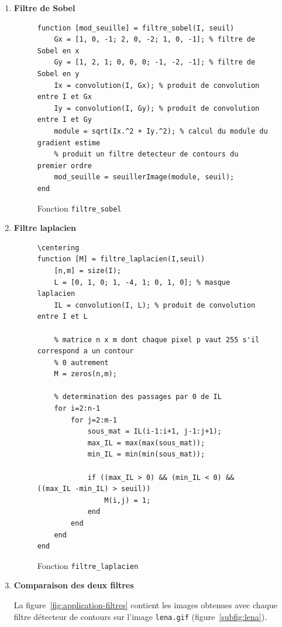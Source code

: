 \documentclass[a4paper]{article}
\newcommand{\figref}[1]{figure~\ref{#1}}
\begin{document}
\begin{enumerate}
    \item \textbf{Filtre de Sobel }

\begin{figure}[H]
\begin{lstlisting}
function [mod_seuille] = filtre_sobel(I, seuil)
    Gx = [1, 0, -1; 2, 0, -2; 1, 0, -1]; % filtre de Sobel en x
    Gy = [1, 2, 1; 0, 0, 0; -1, -2, -1]; % filtre de Sobel en y 
    Ix = convolution(I, Gx); % produit de convolution entre I et Gx 
    Iy = convolution(I, Gy); % produit de convolution entre I et Gy
    module = sqrt(Ix.^2 + Iy.^2); % calcul du module du gradient estime 
    % produit un filtre detecteur de contours du premier ordre
    mod_seuille = seuillerImage(module, seuil); 
end
\end{lstlisting}
\caption{Fonction \texttt{filtre\_sobel}}
\end{figure}

    \item \textbf{Filtre laplacien}

\begin{figure}[H]
\begin{lstlisting}
\centering
function [M] = filtre_laplacien(I,seuil)
    [n,m] = size(I);
    L = [0, 1, 0; 1, -4, 1; 0, 1, 0]; % masque laplacien 
    IL = convolution(I, L); % produit de convolution entre I et L
    
    % matrice n x m dont chaque pixel p vaut 255 s'il correspond a un contour
    % 0 autrement
    M = zeros(n,m);
    
    % determination des passages par 0 de IL
    for i=2:n-1
        for j=2:m-1
            sous_mat = IL(i-1:i+1, j-1:j+1);
            max_IL = max(max(sous_mat));
            min_IL = min(min(sous_mat));
    
            if ((max_IL > 0) && (min_IL < 0) && ((max_IL -min_IL) > seuil))
                M(i,j) = 1;
            end
        end
    end
end
\end{lstlisting}
\caption{Fonction \texttt{filtre\_laplacien}}
\end{figure}

    \item \textbf{Comparaison des deux filtres}

La \figref{fig:application-filtres} contient les images obtenues avec chaque
        filtre détecteur de contours sur l'image \texttt{lena.gif}
        (\figref{subfig:lena}). \\


\end{enumerate}
\end{document}
